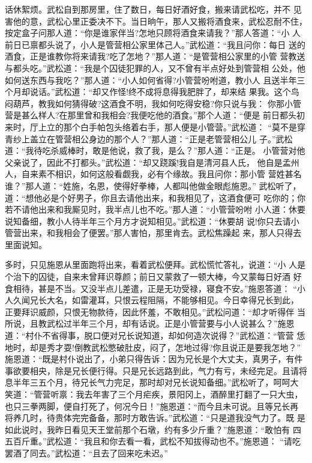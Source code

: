 话休絮烦。武松自到那房里，住了数日，每日好酒好食，搬来请武松吃，并不
见害他的意，武松心里正委决不下。当日晌午，那人又搬将酒食来，武松忍耐不住，
按定盒子问那人道：“你是谁家伴当?怎地只顾将酒食来请我？”那人答道：“小
人前日已禀都头说了，小人是管营相公家里体己人。”武松道：“我且问你：每日
送的酒食，正是谁教你将来请我?吃了怎地？”那人道：“是管营相公家里的小管
营教送与都头吃。”武松道：“我是个囚徒犯罪的人，又不曾有半点好处到管营相
公处，他如何送东西与我吃？”那人道：“小人如何省得?小管营吩咐道，教小人
且送半年三个月却说话。”武松道：“却又作怪!终不成将息得我肥胖了，却来结
果我。这个鸟闷葫芦，教我如何猜得破?这酒食不明，我如何吃得安稳?你只说与我：
你那小管营是甚么样人?在那里曾和我相会?我便吃他的酒食。”那个人道：“便是
前日都头初来时，厅上立的那个白手帕包头络着右手，那人便是小管营。”武松道：
“莫不是穿青纱上盖立在管营相公身边的那个人？”那人道：“正是老管营相公儿
子。”武松道：“我待吃杀威棒时，敢是他说，救了我，是么？”那人道：“正是。
小管营对他父亲说了，因此不打都头。”武松道：“却又跷蹊!我自是清河县人氏，
他自是孟州人，自来素不相识，如何这般看觑我，必有个缘故。我且问你：那小管
营姓甚名谁？”那人道：“姓施，名恩，使得好拳棒，人都叫他做金眼彪施恩。”
武松听了，道：“想他必是个好男子，你且去请他出来，和我相见了，这酒食便可
吃你的；你若不请他出来和我厮见时，我半点儿也不吃。”那人道：“小管营吩咐
小人道：休要说知备细，教小人待半年三个月方才说知相见。”武松道：“休要胡
说!你只去请小管营出来，和我相会了便罢。”那人害怕，那里肯去。武松焦躁起
来，那人只得去里面说知。

多时，只见施恩从里面跑将出来，看着武松便拜。武松慌忙答礼，说道：“小
人是个治下的囚徒，自来未曾拜识尊颜；前日又蒙救了一顿大棒，今又蒙每日好酒
好食相待，甚是不当。又没半点儿差遣，正是无功受禄，寝食不安。”施恩答道：
“小人久闻兄长大名，如雷灌耳，只恨云程阻隔，不能够相见。今日幸得兄长到此，
正要拜识威颜，只恨无物款待，因此怀羞，不敢相见。”武松问道：“却才听得伴
当所说，且教武松过半年三个月，却有话说。正是小管营要与小人说甚么？”施恩
道：“村仆不省得事，脱口便对兄长说知道，却如何造次说得？”武松道：“管营
恁地时，却是秀才耍!倒教武松憋破肚皮，闷了，怎地过得?你且说正是要我怎地？”
施恩道：“既是村仆说出了，小弟只得告诉：因为兄长是个大丈夫，真男子，有件
事欲要相央，除是兄长便行得。只是兄长远路到此，气力有亏，未经完足。且请将
息半年三五个月，待兄长气力完足，那时却对兄长说知备细。”武松听了，呵呵大
笑道：“管营听禀：我去年害了三个月疟疾，景阳冈上，酒醉里打翻了一只大虫，
也只三拳两脚，便自打死了，何况今日！”施恩道：“而今且未可说。且等兄长再
将养几时，待贵体完完备备，那时方敢告诉。”武松道：“只是道我没气力了。既
是如此说时，我昨日看见天王堂前那个石墩，约有多少斤重？”施恩道：“敢怕有
四五百斤重。”武松道：“我且和你去看一看，武松不知拔得动也不。”施恩道：
“请吃罢酒了同去。”武松道：“且去了回来吃未迟。”

